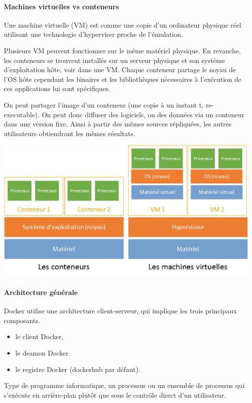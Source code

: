\documentclass[french, 12pt]{article}%
\newcommand{\itemE}{\item[$\bullet$]}
\newcommand{\titreencadre}{Titre}
\newenvironment{encadre}[1]{\renewcommand{\titreencadre}{#1}
	\begin{mdframed}[style=encadrestyle]
	\vspace{0.5\baselineskip}
	}{%
	\end{mdframed}}
\begin{document}
\paragraph{Machines virtuelles vs conteneurs} Une machine virtuelle (VM) est comme une copie d'un ordinateur physique réel utilisant une technologie d’hyperviser proche de l’émulation. 

Plusieurs VM peuvent fonctionner sur le même matériel physique. En revanche, les conteneurs se trouvent installés sur un serveur physique et son système d'exploitation hôte, voir dans une VM.
Chaque conteneur partage le noyau de l'OS hôte cependant les binaires et les bibliothèques nécessaires à l'exécution de ces applications lui sont spécifiques.
  
On peut partager l’image d’un conteneur (une copie à un instant t, re-executable).  On peut donc diffuser des logiciels, ou des données via un conteneur dans une version fixe.  Ainsi à partir des mêmes sources répliquées, les autres utilisateurs obtiendront les mêmes résultats. 


\begin{center}
\includegraphics[scale=0.6]{./ressource/conteneur_vs_mv.png}
\end{center}

\paragraph{Architecture générale} Docker utilise une architecture client-serveur, qui implique les trois principaux composants.   
\begin{itemize}
\itemE le client Docker, 
\itemE le deamon Docker 
\itemE le registre Docker (dockerhub par défaut).
\end{itemize}
  
\begin{encadre}{Daemon}
Type de programme informatique, un processus ou un ensemble de processus qui s'exécute en arrière-plan plutôt que sous le contrôle direct d'un utilisateur.
\end{encadre}  
  
\end{document}
